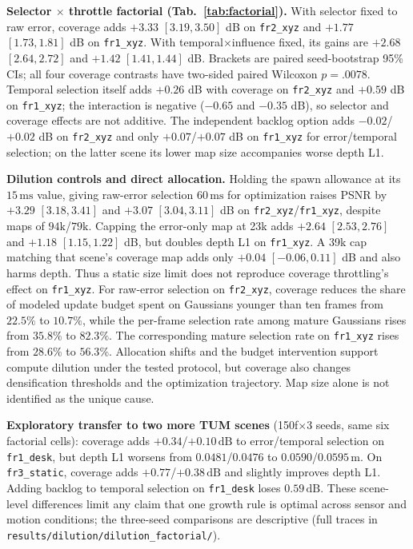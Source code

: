 \documentclass[10pt,twocolumn,letterpaper]{article}
\begin{document}
\textbf{Selector $\times$ throttle factorial (Tab.~\ref{tab:factorial}).} With selector fixed to raw error, coverage adds $+3.33$ $[3.19,3.50]$ dB on \texttt{fr2\_xyz} and $+1.77$ $[1.73,1.81]$ dB on \texttt{fr1\_xyz}. With temporal$\times$influence fixed, its gains are $+2.68$ $[2.64,2.72]$ and $+1.42$ $[1.41,1.44]$ dB. Brackets are paired seed-bootstrap 95\% CIs; all four coverage contrasts have two-sided paired Wilcoxon $p=.0078$. Temporal selection itself adds $+0.26$ dB with coverage on \texttt{fr2\_xyz} and $+0.59$ dB on \texttt{fr1\_xyz}; the interaction is negative ($-0.65$ and $-0.35$ dB), so selector and coverage effects are not additive. The independent backlog option adds $-0.02$/$+0.02$ dB on \texttt{fr2\_xyz} and only $+0.07$/$+0.07$ dB on \texttt{fr1\_xyz} for error/temporal selection; on the latter scene its lower map size accompanies worse depth L1.

\textbf{Dilution controls and direct allocation.} Holding the spawn allowance at its $15\,\mathrm{ms}$ value, giving raw-error selection $60\,\mathrm{ms}$ for optimization raises PSNR by $+3.29$ $[3.18,3.41]$ and $+3.07$ $[3.04,3.11]$ dB on \texttt{fr2\_xyz}/\texttt{fr1\_xyz}, despite maps of $94\mathrm{k}$/$79\mathrm{k}$. Capping the error-only map at 23k adds $+2.64$ $[2.53,2.76]$ and $+1.18$ $[1.15,1.22]$ dB, but doubles depth L1 on \texttt{fr1\_xyz}. A 39k cap matching that scene's coverage map adds only $+0.04$ $[-0.06,0.11]$ dB and also harms depth. Thus a static size limit does not reproduce coverage throttling's effect on \texttt{fr1\_xyz}. For raw-error selection on \texttt{fr2\_xyz}, coverage reduces the share of modeled update budget spent on Gaussians younger than ten frames from $22.5\%$ to $10.7\%$, while the per-frame selection rate among mature Gaussians rises from $35.8\%$ to $82.3\%$. The corresponding mature selection rate on \texttt{fr1\_xyz} rises from $28.6\%$ to $56.3\%$. Allocation shifts and the budget intervention support compute dilution under the tested protocol, but coverage also changes densification thresholds and the optimization trajectory. Map size alone is not identified as the unique cause.

\textbf{Exploratory transfer to two more TUM scenes} (150f$\times$3 seeds, same six factorial cells): coverage adds $+0.34$/$+0.10\,\mathrm{dB}$ to error/temporal selection on \texttt{fr1\_desk}, but depth L1 worsens from $0.0481$/$0.0476$ to $0.0590$/$0.0595\,\mathrm{m}$. On \texttt{fr3\_static}, coverage adds $+0.77$/$+0.38\,\mathrm{dB}$ and slightly improves depth L1. Adding backlog to temporal selection on \texttt{fr1\_desk} loses $0.59\,\mathrm{dB}$. These scene-level differences limit any claim that one growth rule is optimal across sensor and motion conditions; the three-seed comparisons are descriptive (full traces in \texttt{results/dilution/dilution\_factorial/}).
\end{document}
